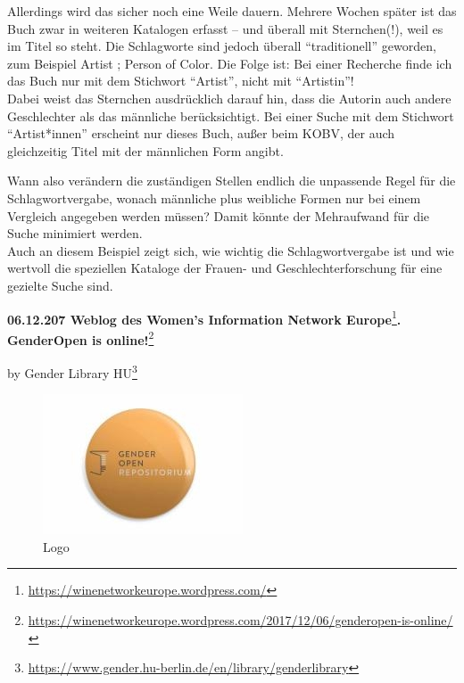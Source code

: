 \documentclass[a4paper,
fontsize=11pt,
oneside,
numbers=noperiodatend,
parskip=half-,
bibliography=totoc,
final
]{scrartcl}
\begin{document}
Allerdings wird das sicher noch eine Weile dauern. Mehrere Wochen später
ist das Buch zwar in weiteren Katalogen erfasst -- und überall mit
Sternchen(!), weil es im Titel so steht. Die Schlagworte sind jedoch
überall \enquote{traditionell} geworden, zum Beispiel Artist ; Person of
Color. Die Folge ist: Bei einer Recherche finde ich das Buch nur mit dem
Stichwort \enquote{Artist}, nicht mit \enquote{Artistin}!\\
Dabei weist das Sternchen ausdrücklich darauf hin, dass die Autorin auch
andere Geschlechter als das männliche berücksichtigt. Bei einer Suche
mit dem Stichwort \enquote{Artist*innen} erscheint nur dieses Buch,
außer beim KOBV, der auch gleichzeitig Titel mit der männlichen Form
angibt.

Wann also verändern die zuständigen Stellen endlich die unpassende Regel
für die Schlagwortvergabe, wonach männliche plus weibliche Formen nur
bei einem Vergleich angegeben werden müssen? Damit könnte der
Mehraufwand für die Suche minimiert werden.\\
Auch an diesem Beispiel zeigt sich, wie wichtig die Schlagwortvergabe
ist und wie wertvoll die speziellen Kataloge der Frauen- und
Geschlechterforschung für eine gezielte Suche sind.

\textbf{06.12.207 Weblog des Women's Information Network
Europe}\footnote{\url{https://winenetworkeurope.wordpress.com/}}\textbf{.
GenderOpen is online!}\footnote{\url{https://winenetworkeurope.wordpress.com/2017/12/06/genderopen-is-online/}}

by Gender Library HU\footnote{\url{https://www.gender.hu-berlin.de/en/library/genderlibrary}}

\begin{figure}
\centering
\includegraphics{img/Aleksander_2.jpg}
\caption{Logo}
\end{figure}
\end{document}
